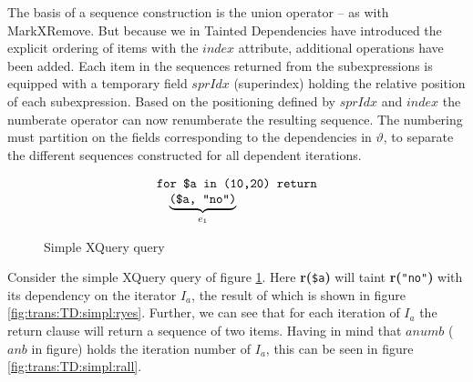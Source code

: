 The basis of a sequence construction is the \textsf{union} operator -- as with MarkXRemove. But because we in
Tainted Dependencies have introduced the explicit ordering of items with the $index$ attribute, additional
operations have been added. Each item in the sequences returned from the subexpressions is equipped with a
temporary field $sprIdx$ (superindex) holding the relative position of each subexpression. Based on the
positioning defined by $sprIdx$ and $index$ the \textsf{numberate} operator can now renumberate the resulting
sequence. The numbering must partition on the fields corresponding to the dependencies in $\vartheta$, to separate
the different sequences constructed for all dependent iterations.

\begin{myExample}
\label{ex:trans:TD:simpleSeq}
\begin{figure}[h]
\begin{equation*}
\begin{array}{l}
\mbox{\texttt{for \$a in (10,20) return}} \\ \quad 
\underbrace{ \mbox{\texttt{(\$a, "no")}} }_{e_{1}}
\end{array}
\end{equation*}
\caption{Simple XQuery query}
\label{fig:trans:TD:simpQuery}
\end{figure}
Consider the simple XQuery query of figure \ref{fig:trans:TD:simpQuery}. Here \textbf{r(}\texttt{\$a}\textbf{)}
will taint \textbf{r(}\texttt{"no"}\textbf{)} with its dependency on the iterator $I_{a}$, the result of which is shown in figure \ref{fig:trans:TD:simpl:ryes}. Further, we can see that
for each iteration of $I_{a}$ the return clause will return a sequence of two items. Having in mind that $anumb$
($anb$ in figure) holds the iteration number of $I_{a}$, this can be seen in figure \ref{fig:trans:TD:simpl:rall}.


\end{myExample}
